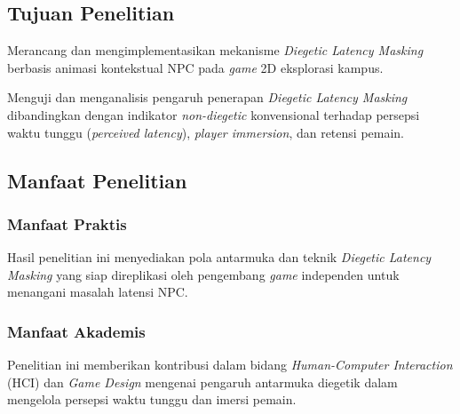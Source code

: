 \subsection{Tujuan Penelitian}
\begin{daftartujuan}
    \item Merancang dan mengimplementasikan mekanisme \textit{Diegetic Latency Masking} berbasis animasi kontekstual NPC pada \textit{game} 2D eksplorasi kampus.
    \item Menguji dan menganalisis pengaruh penerapan \textit{Diegetic Latency Masking} dibandingkan dengan indikator \textit{non-diegetic} konvensional terhadap persepsi waktu tunggu (\textit{perceived latency}), \textit{player immersion}, dan retensi pemain.
\end{daftartujuan}

\subsection{Manfaat Penelitian}

\subsubsection{Manfaat Praktis}
Hasil penelitian ini menyediakan pola antarmuka dan teknik \textit{Diegetic Latency Masking} yang siap direplikasi oleh pengembang \textit{game} independen untuk menangani masalah latensi NPC.

\subsubsection{Manfaat Akademis}
Penelitian ini memberikan kontribusi dalam bidang \textit{Human-Computer Interaction} (HCI) dan \textit{Game Design} mengenai pengaruh antarmuka diegetik dalam mengelola persepsi waktu tunggu dan imersi pemain.

